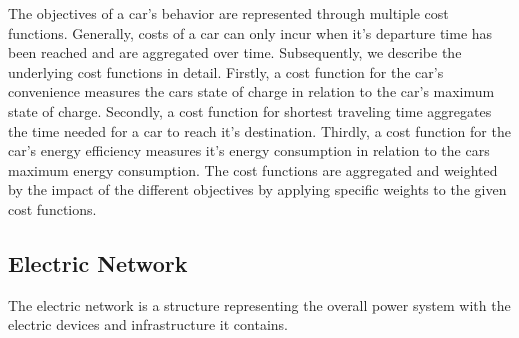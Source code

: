 The objectives of a car's behavior are represented through multiple cost functions. Generally, costs of a car can only incur when it's departure time has been reached and are aggregated over time. Subsequently, we describe the underlying cost functions in detail. Firstly, a cost function for the car's convenience measures the cars state of charge in relation to the car's maximum state of charge. Secondly, a cost function for shortest traveling time aggregates the time needed for a car to reach it's destination. Thirdly, a cost function for the car's energy efficiency measures it's energy consumption in relation to the cars maximum energy consumption. The cost functions are aggregated and weighted by the impact of the different objectives by applying specific weights to the given cost functions.

\subsection{Electric Network}

The electric network is a structure representing the overall power system with the electric devices and infrastructure it contains.


